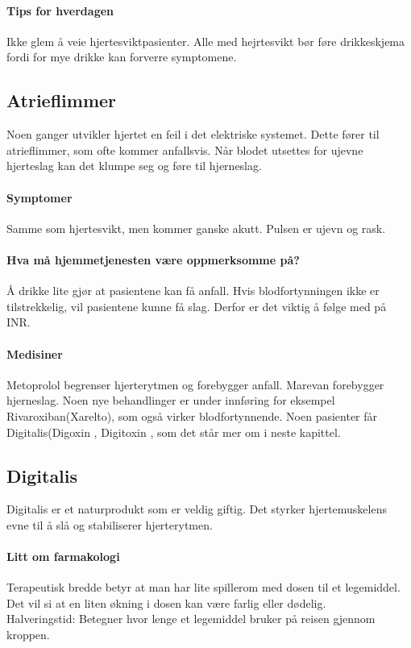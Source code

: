 				\paragraph{Tips for hverdagen\\}
					Ikke glem å veie hjertesviktpasienter. Alle med hejrtesvikt bør føre drikkeskjema fordi for mye drikke kan forverre symptomene. 
			\subsection{Atrieflimmer}
				Noen ganger utvikler hjertet en feil i det elektriske systemet. Dette fører til atrieflimmer, som ofte kommer anfallsvis. Når blodet utsettes for ujevne hjerteslag kan det klumpe seg og føre til hjerneslag.
				\paragraph{Symptomer\\}
					Samme som hjertesvikt, men kommer ganske akutt. Pulsen er ujevn og rask. 
				\paragraph{Hva må hjemmetjenesten være oppmerksomme på?\\}
					Å drikke lite gjør at pasientene kan få anfall. Hvis blodfortynningen ikke er tilstrekkelig, vil pasientene kunne få slag. Derfor er det viktig å følge med på INR. 
				\paragraph{Medisiner\\}
					Metoprolol begrenser hjerterytmen og forebygger anfall. Marevan forebygger hjerneslag. Noen nye behandlinger er under innføring for eksempel Rivaroxiban(Xarelto\textregistered), som også virker blodfortynnende. Noen pasienter får Digitalis(Digoxin \textregistered, Digitoxin \textregistered, som det står mer om i neste kapittel.
			\subsection{Digitalis}
				Digitalis er et naturprodukt som er veldig giftig. Det styrker hjertemuskelens evne til å slå og stabiliserer hjerterytmen.
				\paragraph{Litt om farmakologi\\}
					Terapeutisk bredde betyr at man har lite spillerom med dosen til et legemiddel. Det vil si at en liten økning i dosen kan være farlig eller dødelig. \\
					Halveringstid: Betegner hvor lenge et legemiddel bruker på reisen gjennom kroppen.\\
